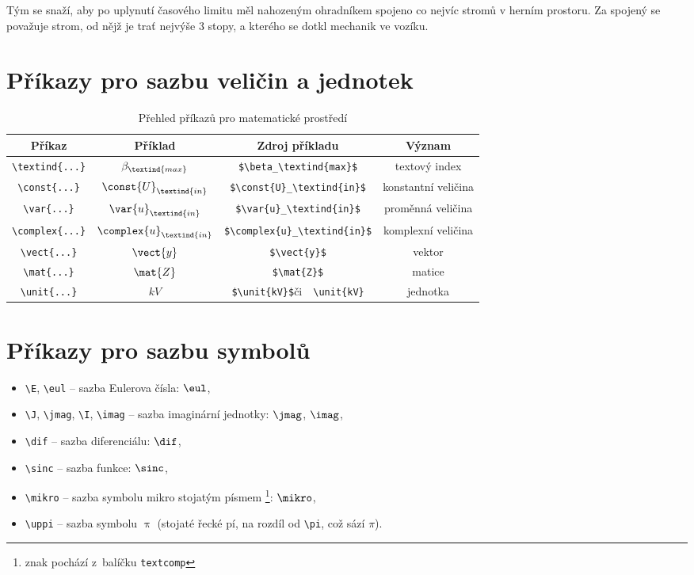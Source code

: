 Tým se snaží, aby po uplynutí časového limitu měl nahozeným ohradníkem spojeno co nejvíc stromů v herním prostoru. Za spojený se považuje strom, od nějž je trať nejvýše 3 stopy, a kterého se dotkl mechanik ve vozíku. 

\iffalse
\section{Příkazy pro sazbu veličin a jednotek}

\begin{table}[!h]
  \caption[Přehled příkazů]{Přehled příkazů pro matematické prostředí }
  \begin{center}
  	\small
	  \begin{tabular}{|c|c|c|c|}
	    \hline
	    Příkaz    						& Příklad 					& Zdroj příkladu  							& Význam  \\
	    \hline\hline
	    \verb|\textind{...}|	& $\beta_\textind{max}$ 	& \verb|$\beta_\textind{max}$|	& textový index \\
	    \hline
	    \verb|\const{...}| 		& $\const{U}_\textind{in}$ 				& \verb|$\const{U}_\textind{in}$|		& konstantní veličina \\
	    \hline
	    \verb|\var{...}| 		& $\var{u}_\textind{in}$ & \verb|$\var{u}_\textind{in}$| & proměnná veličina \\
	    \hline
	    \verb|\complex{...}| 	& $\complex{u}_\textind{in}$ & \verb|$\complex{u}_\textind{in}$| & komplexní veličina \\
	    \hline
	    \verb|\vect{...}| 		& $\vect{y}$ 						& \verb|$\vect{y}$| & vektor \\
	    \hline
	    \verb|\mat{...}| 	& $\mat{Z}$ 						& \verb|$\mat{Z}$| & matice \\
	    \hline
	    \verb|\unit{...}| 		& $\unit{kV}$ 						& \verb|$\unit{kV}$|\quad či\ \, \verb|\unit{kV}| & jednotka \\
	    \hline
	  \end{tabular}
  \end{center}
\end{table}



\newpage
\section{Příkazy pro sazbu symbolů}

\begin{itemize}
  \item
    \verb|\E|, \verb|\eul| -- sazba Eulerova čísla: $\eul$,
  \item
    \verb|\J|, \verb|\jmag|, \verb|\I|, \verb|\imag| -- sazba imaginární jednotky: $\jmag$, $\imag$,
  \item
    \verb|\dif| -- sazba diferenciálu: $\dif$,
  \item
    \verb|\sinc| -- sazba funkce: $\sinc$,
  \item
    \verb|\mikro| -- sazba symbolu mikro stojatým písmem%
			\footnote{znak pochází z~balíčku \texttt{textcomp}}: $\mikro$,
	\item
		\verb|\uppi| -- sazba symbolu $\uppi$
			(stojaté řecké pí, na rozdíl od \verb|\pi|, což sází $\pi$).
\end{itemize}

